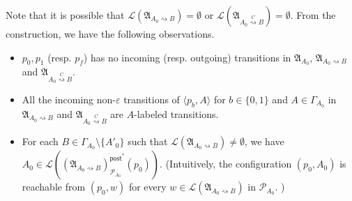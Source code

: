 \documentclass[preprint,12pt]{elsarticle}
\newcommand\Pp{{\mathcal{P} }}
\newcommand\post{{\mathsf{post} }}
\newcommand\Aut{{\mathfrak{A} }}
\newcommand\Lang{{\mathscr{L} }}
\begin{document}
Note that it is possible that $\Lang(\Aut_{A_0\rightsquigarrow B}) =\emptyset$ or $\Lang(\Aut_{A_0\stackrel{C}\rightsquigarrow B})=\emptyset$. From the construction, we have the following observations. 
\begin{itemize}
    \item $p_0,p_1$ (resp. $p_f$) has no incoming (resp. outgoing) transitions in $\Aut_{A_0}$, $\Aut_{A_0\rightsquigarrow B}$ and $\Aut_{A_0\stackrel{C}\rightsquigarrow B}$.
    \item All the incoming non-$\varepsilon$ transitions of $\langle p_b, A\rangle$ for $b \in \{0,1\}$ and $A \in \Gamma_{A_0}$ in $\Aut_{A_0\rightsquigarrow B}$ and $\Aut_{A_0\stackrel{C}\rightsquigarrow B}$ are $A$-labeled transitions.
    \item For each $B \in \Gamma_{A_0} \setminus \{A'_0\}$ such that $\Lang(\Aut_{A_0 \rightsquigarrow B}) \neq \emptyset$,  we have $A_0 \in \Lang((\Aut_{A_0 \rightsquigarrow B})^{\post^*}_{\Pp_{A_0}}(p_0))$.  (Intuitively, the configuration $(p_0, A_0)$ is reachable from $(p_0, w)$ for every $w \in \Lang(\Aut_{A_0 \rightsquigarrow B})$ in $\Pp_{A_0}$. ) 
\end{itemize}
\end{document}
